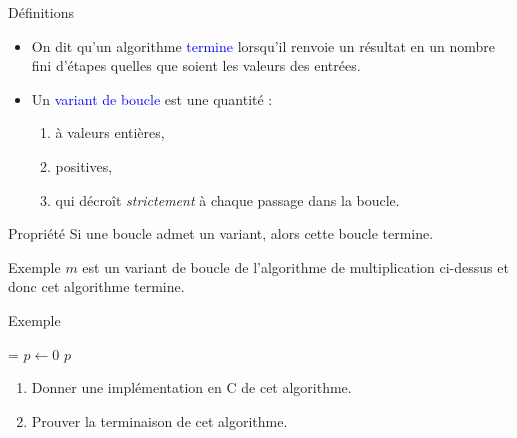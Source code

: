\documentclass[10pt,french]{beamer}
\begin{document}
\begin{frame}[fragile]{\Ctitle}{\stitle}
	\begin{block}{Définitions}
    \begin{itemize}
        \item<2-> On dit qu'un algorithme \textcolor{blue}{termine} lorsqu'il renvoie un résultat en un nombre fini d'étapes quelles que soient les valeurs des entrées.
        \item<3-> Un \textcolor{blue}{variant de boucle} est une quantité :
            \begin{enumerate}
            \item<4-> à valeurs entières,
            \item<5-> positives,
            \item<6-> qui décroît \textit{strictement} à chaque passage dans la boucle.
            \end{enumerate}
		\end{itemize}
	\end{block}
	{\begin{alertblock}{\textcolor{yellow}{\important \;} Propriété}
		Si une boucle admet un variant, alors cette boucle termine.
	\end{alertblock}}
	{
		\begin{exampleblock}{Exemple}
			$m$ est un variant de boucle de l'algorithme de multiplication ci-dessus et donc cet algorithme termine.
		\end{exampleblock}
	}
\end{frame}

\begin{frame}[fragile]{\Ctitle}{\stitle}
	\begin{exampleblock}{Exemple}
	\SetAlFnt{\small}
	\setlength{\algomargin}{8pt}
	\begin{algorithm}[H]
		\DontPrintSemicolon
		\caption{Nombre de chiffres en base 10}
		\everypar={\footnotesize \textcolor{gray}{\nl}}
		$p \leftarrow 0$\;
		\Return $p$
	  \end{algorithm}
	  \begin{enumerate}
	  \item<2-> Donner une implémentation en C de cet algorithme.
	  \item<3-> Prouver la terminaison de cet algorithme.
	  \end{enumerate}
	\end{exampleblock}
\end{frame}
\end{document}
